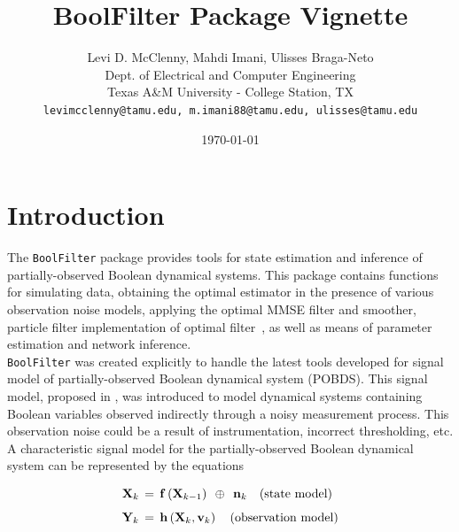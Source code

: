 \documentclass[a4paper]{article}
\title{BoolFilter Package Vignette}
\author{Levi D. McClenny, Mahdi Imani, Ulisses Braga-Neto\\
        Dept. of Electrical and Computer Engineering\\
  	Texas A\&M University - College Station, TX\\
		\texttt{levimcclenny@tamu.edu, m.imani88@tamu.edu, ulisses@tamu.edu}}  %
\date{\today}  %
\newcommand{\bal}{\begin{aligned}}
\newcommand{\eal}{\end{aligned}}
\newcommand{\beq}{\begin{equation}}
\newcommand{\eeq}{\end{equation}}
\theoremstyle{plain}
\theoremstyle{definition}
\theoremstyle{remark}
\def\Xk{{\bf X}_k}
\def\Yk{{\bf Y}_k}
\def\f{{\bf{f}}}
\def\Xkm{{\bf X}_{k-1}}
\def\h{{\bf{h}}}
\def\nk{{\bf n}_k}
\def\vk{{\bf v}_k}
\def\vk{{\bf v}_k}
\begin{document}

\maketitle
\tableofcontents
\clearpage
\section{Introduction}


\indent The \texttt{BoolFilter} package provides tools for state estimation and inference of partially-observed Boolean dynamical systems. 
This package contains functions for simulating data, obtaining the optimal estimator in the presence of various observation noise models\cite{Brag:11}, applying the optimal MMSE filter and smoother\cite{ImanBrag:15b}, particle filter implementation of optimal filter~\cite{braga2013particle}, as well 
as means of parameter estimation and network inference\cite{ImanBrag:15a}.
\\[1em]
\indent \texttt{BoolFilter} was created explicitly to handle the latest tools developed for signal model of partially-observed Boolean dynamical system (POBDS).
This signal model, proposed in \cite{Brag:11}, was introduced to model dynamical systems containing Boolean variables observed indirectly through a noisy measurement process. This observation noise could be a result of instrumentation, incorrect thresholding, etc. 
\\[1em]
A characteristic signal model for the partially-observed Boolean dynamical system can be represented by the equations\cite{Brag:11}\cite{ImanBrag:16b}

\beq
\bal
  \Xk &\,=\, \f\left(\Xkm\right) \:\:\oplus\:\: \nk\quad \textrm{(state model)} \\[1ex]
  \Yk &\,=\, \h\left(\Xk,\vk\right) \quad \textrm{(observation model)}
\label{eq-sgnmodel}
\eal
\eeq
\end{document}
